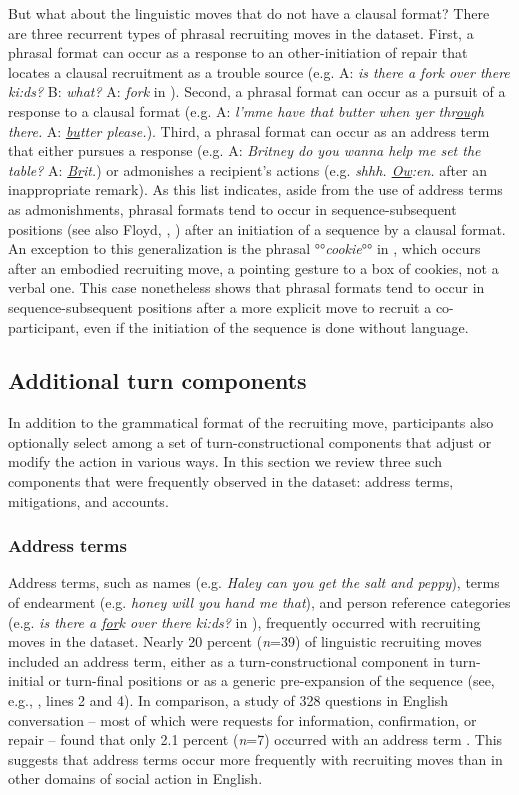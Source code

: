 \documentclass[output=paper,nonflat,modfont,draft]{langsci/langscibook}
\begin{document}
But what about the linguistic moves that do not have a clausal format? There are three recurrent types of phrasal recruiting moves in the dataset. First, a phrasal format can occur as a response to an other-initiation of repair that locates a clausal recruitment as a trouble source (e.g. A: \textit{is there a fork over there ki:ds?} B: \textit{what?} A: \textit{fork} in ). Second, a phrasal format can occur as a pursuit of a response to a clausal format (e.g. A: \textit{l'mme have that butter when yer thr\uline{ou}gh there.} A: \textit{\uline{bu}tter please.}). Third, a phrasal format can occur as an address term that either pursues a response (e.g. A: \textit{Britney do you wanna help me set the table?} A: \textit{\uline{Br}it.}) or admonishes a recipient’s actions (e.g. \textit{shhh. \uline{Ow}:en.} after an inappropriate remark). As this list indicates, aside from the use of address terms as admonishments, phrasal formats tend to occur in sequence-subsequent positions (see also Floyd, , ) after an initiation of a sequence by a clausal format. An exception to this generalization is the phrasal °°\textit{cookie}°° in , which occurs after an embodied recruiting move, a pointing gesture to a box of cookies, not a verbal one. This case nonetheless shows that phrasal formats tend to occur in sequence-subsequent positions after a more explicit move to recruit a co-participant, even if the initiation of the sequence is done without language.

\subsection{Additional turn components}
In addition to the grammatical format of the recruiting move, participants also optionally select among a set of turn-constructional components that adjust or modify the action in various ways. In this section we review three such components that were frequently observed in the dataset: address terms, mitigations, and accounts.

\subsubsection{Address terms}\label{sec:kendrick:4.3.1}
Address terms, such as names (e.g. \textit{Haley can you get the salt and peppy}), terms of endearment (e.g. \textit{honey will you hand me that}), and person reference categories (e.g. \textit{is there a f\uline{or}k over there ki:ds?} in ), frequently occurred with recruiting moves in the dataset. Nearly 20 percent (\textit{n}=39) of linguistic recruiting moves included an address term, either as a turn-constructional component in turn-initial or turn-final positions or as a generic pre-expansion of the sequence (see, e.g., , lines 2 and 4). In comparison, a study of 328 questions in English conversation -- most of which were requests for information, confirmation, or repair -- found that only 2.1 percent (\textit{n}=7) occurred with an address term \citep[2777]{Stivers2010}. This suggests that address terms occur more frequently with recruiting moves than in other domains of social action in English.
\end{document}

